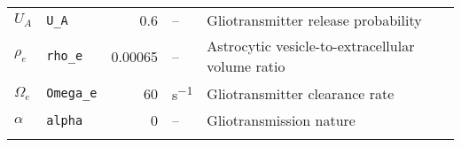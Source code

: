 \documentclass[a4paper, 11pt]{article}
\let\oldhline\hline
\renewcommand{\hline}{\oldhline\noalign{\vskip 0.5ex}}
\begin{document}
\begin{appendices}
{\begin{tabularx}{\textwidth}{l l r l X}
$U_A$      & \lstinline|U_A| 	 & 0.6  & --		        & Gliotransmitter release probability\\
$\rho_e$   & \lstinline|rho_e|   & 0.00065 &--			    & Astrocytic vesicle-to-extracellular volume ratio\\
$\Omega_e$ & \lstinline|Omega_e| & 60	&\si{s^{-1}} 		& Gliotransmitter clearance rate\\
$\alpha$   & \lstinline|alpha|   & 0 	& --				& Gliotransmission nature\\
\hline
\end{tabularx}
}

\end{appendices}

\newpage

\end{document}
